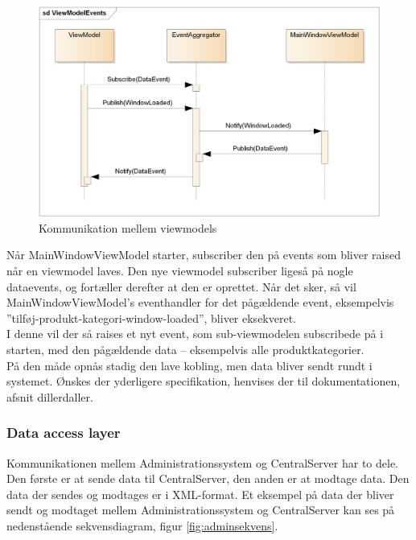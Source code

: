 \begin{figure}[H]
	\centering
	\includegraphics[width=\textwidth]{Projektbeskrivelse/DesignOgImplementering/Images/ViewModelEvents}
	\caption{Kommunikation mellem viewmodels}
	\label{fig:vmcom}
\end{figure}

Når MainWindowViewModel starter, subscriber den på events som bliver raised når en viewmodel laves. Den nye viewmodel subscriber ligeså på nogle dataevents, og fortæller derefter at den er oprettet. Når det sker, så vil MainWindowViewModel’s eventhandler for det pågældende event, eksempelvis ”tilføj-produkt-kategori-window-loaded”, bliver eksekveret.\\
 I denne vil der så raises et nyt event, som sub-viewmodelen subscribede på i starten, med den pågældende data – eksempelvis alle produktkategorier.\\
På den måde opnås stadig den lave kobling, men data bliver sendt rundt i systemet. 
Ønskes der yderligere specifikation, henvises der til dokumentationen, afsnit dillerdaller.\\


\subsubsection{Data access layer}
Kommunikationen mellem Administrationssystem og CentralServer har to dele. Den første er at sende data til CentralServer, den anden er at modtage data. Den data der sendes og modtages er i XML-format. Et eksempel på data der bliver sendt og modtaget mellem Administrationssystem og CentralServer kan ses på nedenstående sekvensdiagram, figur \ref{fig:adminsekvens}.

